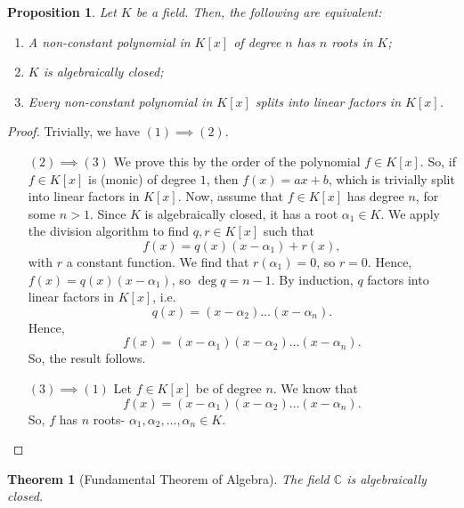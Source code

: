 \documentclass[a4paper, openany]{memoir}
\theoremstyle{definition}
\theoremstyle{plain}
\newtheorem{theorem}[definition]{Theorem}
\newtheorem{proposition}[definition]{Proposition}
\begin{document}
    \begin{proposition}
        Let $K$ be a field. Then, the following are equivalent:
        \begin{enumerate}
            \item A non-constant polynomial in $K[x]$ of degree $n$ has $n$ roots in $K$;
            \item $K$ is algebraically closed;
            \item Every non-constant polynomial in $K[x]$ splits into linear factors in $K[x]$.
        \end{enumerate}
    \end{proposition}
    \begin{proof}
        Trivially, we have $(1) \implies (2)$.
        \begin{enumerate}
            \item[$(2) \implies (3)$] We prove this by the order of the polynomial $f \in K[x]$. So, if $f \in K[x]$ is (monic) of degree $1$, then $f(x) = ax + b$, which is trivially split into linear factors in $K[x]$. Now, assume that $f \in K[x]$ has degree $n$, for some $n > 1$. Since $K$ is algebraically closed, it has a root $\alpha_1 \in K$. We apply the division algorithm to find $q, r \in K[x]$ such that
            \[f(x) = q(x) (x - \alpha_1) + r(x),\]
            with $r$ a constant function. We find that $r(\alpha_1) = 0$, so $r = 0$. Hence, $f(x) = q(x) (x - \alpha_1)$, so $\deg q = n - 1$. By induction, $q$ factors into linear factors in $K[x]$, i.e.
            \[q(x) = (x - \alpha_2) \dots (x - \alpha_n).\]
            Hence,
            \[f(x) = (x - \alpha_1) (x - \alpha_2) \dots (x - \alpha_n).\]
            So, the result follows.
            
            \item[$(3) \implies (1)$] Let $f \in K[x]$ be of degree $n$. We know that
            \[f(x) = (x - \alpha_1) (x - \alpha_2) \dots (x - \alpha_n).\]
            So, $f$ has $n$ roots- $\alpha_1, \alpha_2, \dots, \alpha_n \in K$.
        \end{enumerate}
    \end{proof}

    \begin{theorem}[Fundamental Theorem of Algebra]
        The field $\mathbb{C}$ is algebraically closed.
    \end{theorem}
\end{document}
